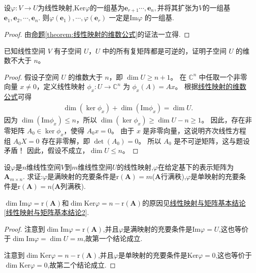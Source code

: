 \documentclass[../../main.tex]{subfiles}%
\begin{document}
\begin{corollary}\label{corollary:由核的基导出值域的基}
设\(\varphi:V\to U\)为线性映射,$\mathrm{Ker}\varphi $的一组基为$\boldsymbol{e}_{r+1}\cdots ,\boldsymbol{e}_n,$并将其扩张为$V$的一组基$\boldsymbol{e}_1,\boldsymbol{e}_2,\cdots ,\boldsymbol{e}_n.$
则$\varphi \left( \boldsymbol{e}_1 \right) ,\cdots ,\varphi \left( \boldsymbol{e}_r \right)$ 一定是Im$\varphi$ 的一组基.
\end{corollary}
\begin{proof}
由\hyperref[theorem:线性映射的维数公式]{命题\ref{theorem:线性映射的维数公式}}的证法一立得.
\end{proof}

\begin{example}
已知线性空间 $V$ 有子空间 $U$，$U$ 中的所有复矩阵都是可逆的，证明子空间 $U$ 的维数不大于 $n$。
\end{example}
\begin{proof}
假设子空间 $U$ 的维数大于 $n$，即 $\dim U \geqslant n+1$。
在 $\mathbb{C}^n$ 中任取一个非零向量 $x \neq 0$，定义线性映射 $\phi_x: U \to \mathbb{C}^n$ 为 $\phi_x(A) = Ax$。
根据\hyperref[theorem:线性映射的维数公式]{线性映射的维数公式}可得
\begin{align*}
\dim(\ker \phi_x) + \dim(\text{Im} \phi_x) = \dim U.
\end{align*}
因为 $\dim(\text{Im} \phi_x) \leqslant n$，所以 $\dim(\ker \phi_x) \geqslant \dim U - n \geqslant 1$。
因此，存在非零矩阵 $A_0 \in \ker \phi_x$，使得 $A_0 x = 0$。
由于 $x$ 是非零向量，这说明齐次线性方程组 $A_0 X = 0$ 存在非零解，即 $\det(A_0) = 0$。
所以 $A_0$ 是不可逆矩阵，这与题设矛盾！
因此，假设不成立，$\dim U \leqslant n$。
\end{proof}

\begin{proposition}\label{proposition:行/列满秩矩阵对应满/单射}
设\(\varphi\)是\(n\)维线性空间\(V\)到\(m\)维线性空间\(U\)的线性映射,\(\varphi\)在给定基下的表示矩阵为\(\boldsymbol{A}_{m\times n}\). 求证:\(\varphi\)是满映射的充要条件是\(\text{r}(\boldsymbol{A}) = m\)($\boldsymbol{A}$行满秩),\(\varphi\)是单映射的充要条件是\(\text{r}(\boldsymbol{A}) = n\)($\boldsymbol{A}$列满秩).
\end{proposition}
\begin{note}
\(\dim\text{Im}\varphi=\text{r}(\boldsymbol{A})\)和\(\dim\text{Ker}\varphi=n - \text{r}(\boldsymbol{A})\)的原因见\hyperref[线性映射与矩阵基本结论2]{线性映射与矩阵基本结论\ref{线性映射与矩阵基本结论2}}.
\end{note}
\begin{proof}
注意到\(\dim\text{Im}\varphi=\text{r}(\boldsymbol{A})\),并且\(\varphi\)是满映射的充要条件是\(\text{Im}\varphi = U\),这也等价于\(\dim\text{Im}\varphi=\dim U = m\),故第一个结论成立.

注意到\(\dim\text{Ker}\varphi=n - \text{r}(\boldsymbol{A})\),并且\(\varphi\)是单映射的充要条件是\(\text{Ker}\varphi = 0\),这也等价于\(\dim\text{Ker}\varphi = 0\),故第二个结论成立.
\end{proof}
\end{document}
